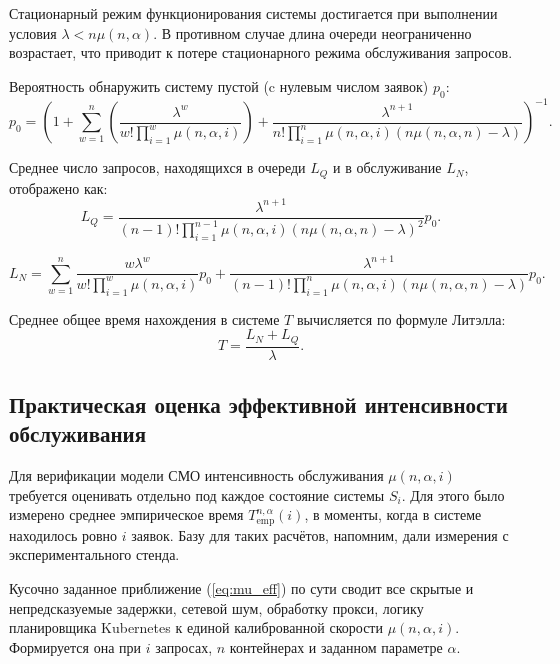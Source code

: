 \documentclass[12pt,a4paper]{article}
\begin{document}
Стационарный режим функционирования системы достигается при выполнении условия $\lambda < n\mu(n,\alpha)$. В противном случае длина очереди неограниченно возрастает, что приводит к потере стационарного режима обслуживания запросов.

Вероятность обнаружить систему пустой (c нулевым числом заявок) $p_0$:
\begin{equation}
  p_0=\left(
  1
  + \sum_{w=1}^{n}\left(\frac{\lambda^w}{w! \prod_{i=1}^{w}\mu\left(n,\alpha,i\right)}\right)
  +\frac{\lambda^{n+1}}{n! \prod_{i=1}^{n}\mu\left(n,\alpha,i\right) \left(n\mu\left(n,\alpha,n\right)-\lambda\right)}
  \right)^{-1}.
  \label{eq:p0}
\end{equation}

Среднее число запросов, находящихся в очереди $L_Q$ и в обслуживание $L_N$, отображено как:
\begin{equation}
  L_Q=\frac{\lambda^{n+1}} {\left(n-1\right)! \prod_{i=1}^{n-1}\mu\left(n,\alpha,i\right)\left(n\mu\left(n,\alpha,n\right)-\lambda\right)^2} p_0.
\end{equation}

\begin{equation}
  L_N = \sum_{w=1}^{n} \frac{w\lambda^w}{w!\prod_{i=1}^{w}\mu\left(n,\alpha,i\right)} p_0
  +\frac{\lambda^{n+1}}{\left(n-1\right)! \prod_{i=1}^{n}\mu\left(n,\alpha,i\right) \left(n\mu\left(n,\alpha,n\right)-\lambda\right)} p_0.
\end{equation}

Среднее общее время нахождения в системе $T$ вычисляется по формуле Литэлла:
\begin{equation}
  T = \frac{L_N + L_Q}{\lambda}.
  \label{eq:T}
\end{equation}

\subsection{Практическая оценка эффективной интенсивности обслуживания}

Для верификации модели СМО интенсивность обслуживания $\mu(n, \alpha, i)$ требуется оценивать отдельно под каждое состояние системы $S_i$. Для этого было измерено среднее эмпирическое время $T_{\text{emp}}^{n, \alpha}(i)$, в моменты, когда в системе находилось ровно $i$ заявок. Базу для таких расчётов, напомним, дали измерения с экспериментального стенда.

Кусочно заданное приближение (\ref{eq:mu_eff}) по сути сводит все скрытые и непредсказуемые задержки, сетевой шум, обработку прокси, логику планировщика Kubernetes к единой калиброванной скорости $\mu(n, \alpha, i)$. Формируется она при $i$ запросах, $n$ контейнерах и заданном параметре $\alpha$.
\end{document}
